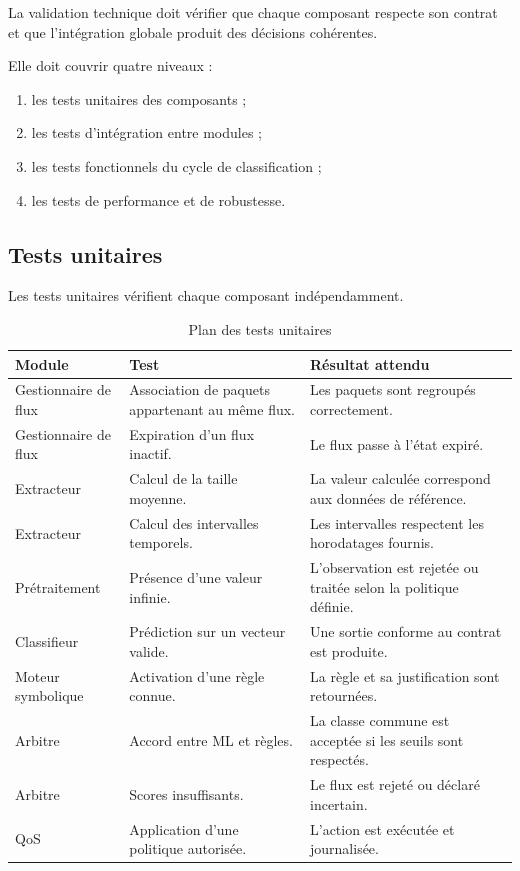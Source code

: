 La validation technique doit vérifier que chaque composant respecte son contrat et que l'intégration globale produit des décisions cohérentes.

Elle doit couvrir quatre niveaux :

\begin{enumerate}
    \item les tests unitaires des composants ;
    \item les tests d'intégration entre modules ;
    \item les tests fonctionnels du cycle de classification ;
    \item les tests de performance et de robustesse.
\end{enumerate}

\subsection{Tests unitaires}

Les tests unitaires vérifient chaque composant indépendamment.

\begin{table}[H]
\centering
\caption{Plan des tests unitaires}
\label{tab:tests_unitaires_detail}
\small
\begin{tabularx}{\textwidth}{|l|X|X|}
\hline
\textbf{Module} & \textbf{Test} & \textbf{Résultat attendu} \\
\hline
Gestionnaire de flux &
Association de paquets appartenant au même flux. &
Les paquets sont regroupés correctement. \\
\hline
Gestionnaire de flux &
Expiration d'un flux inactif. &
Le flux passe à l'état expiré. \\
\hline
Extracteur &
Calcul de la taille moyenne. &
La valeur calculée correspond aux données de référence. \\
\hline
Extracteur &
Calcul des intervalles temporels. &
Les intervalles respectent les horodatages fournis. \\
\hline
Prétraitement &
Présence d'une valeur infinie. &
L'observation est rejetée ou traitée selon la politique définie. \\
\hline
Classifieur &
Prédiction sur un vecteur valide. &
Une sortie conforme au contrat est produite. \\
\hline
Moteur symbolique &
Activation d'une règle connue. &
La règle et sa justification sont retournées. \\
\hline
Arbitre &
Accord entre ML et règles. &
La classe commune est acceptée si les seuils sont respectés. \\
\hline
Arbitre &
Scores insuffisants. &
Le flux est rejeté ou déclaré incertain. \\
\hline
QoS &
Application d'une politique autorisée. &
L'action est exécutée et journalisée. \\
\hline
\end{tabularx}
\end{table}


